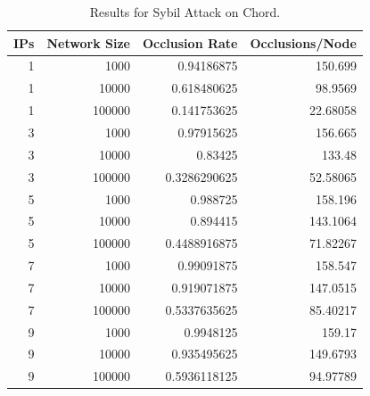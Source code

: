 \documentclass[11pt,conference]{IEEEtran}
\begin{document}
\begin{table}[h]\small
    
        \caption{Results for Sybil Attack on Chord.} %
        \label{tab:exp3}
        
        \begin{tabular}{|r|r|r|r|}
            \hline 
            IPs & Network Size &  Occlusion Rate & Occlusions/Node \\ \hline
            1 & 1000 & 0.94186875 & 150.699 \\ \hline
            1 & 10000 & 0.618480625 & 98.9569 \\ \hline
            1 & 100000 & 0.141753625 & 22.68058 \\ \hline
            3 & 1000 & 0.97915625 & 156.665 \\ \hline
            3 & 10000 & 0.83425 & 133.48 \\ \hline
            3 & 100000 & 0.3286290625 & 52.58065 \\ \hline
            5 & 1000 & 0.988725 & 158.196 \\ \hline
            5 & 10000 & 0.894415 & 143.1064 \\ \hline
            5 & 100000 & 0.4488916875 & 71.82267 \\ \hline
            7 & 1000 & 0.99091875 & 158.547 \\ \hline
            7 & 10000 & 0.919071875 & 147.0515 \\ \hline
            7 & 100000 & 0.5337635625 & 85.40217 \\ \hline
            9 & 1000 & 0.9948125 & 159.17 \\ \hline
            9 & 10000 & 0.935495625 & 149.6793 \\ \hline
            9 & 100000 & 0.5936118125 & 94.97789 \\ \hline
            
            
        \end{tabular}
        
        
    
\end{table}
\end{document}
